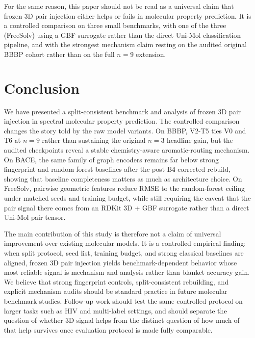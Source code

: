 \documentclass[conference]{IEEEtran}
\begin{document}
For the same reason, this paper should not be read as a universal claim that frozen 3D pair injection either helps or fails in molecular property prediction. It is a controlled comparison on three small benchmarks, with one of the three (FreeSolv) using a GBF surrogate rather than the direct Uni-Mol classification pipeline, and with the strongest mechanism claim resting on the audited original BBBP cohort rather than on the full $n{=}9$ extension.

\section{Conclusion}
\label{sec:conclusion}

We have presented a split-consistent benchmark and analysis of frozen 3D pair injection in spectral molecular property prediction. The controlled comparison changes the story told by the raw model variants. On BBBP, V2-T5 ties V0 and T6 at $n{=}9$ rather than sustaining the original $n{=}3$ headline gain, but the audited checkpoints reveal a stable chemistry-aware aromatic-routing mechanism. On BACE, the same family of graph encoders remains far below strong fingerprint and random-forest baselines after the post-B4 corrected rebuild, showing that baseline completeness matters as much as architecture choice. On FreeSolv, pairwise geometric features reduce RMSE to the random-forest ceiling under matched seeds and training budget, while still requiring the caveat that the pair signal there comes from an RDKit 3D + GBF surrogate rather than a direct Uni-Mol pair tensor.

The main contribution of this study is therefore not a claim of universal improvement over existing molecular models. It is a controlled empirical finding: when split protocol, seed list, training budget, and strong classical baselines are aligned, frozen 3D pair injection yields benchmark-dependent behavior whose most reliable signal is mechanism and analysis rather than blanket accuracy gain. We believe that strong fingerprint controls, split-consistent rebuilding, and explicit mechanism audits should be standard practice in future molecular benchmark studies. Follow-up work should test the same controlled protocol on larger tasks such as HIV and multi-label settings, and should separate the question of whether 3D signal helps from the distinct question of how much of that help survives once evaluation protocol is made fully comparable.
\end{document}
